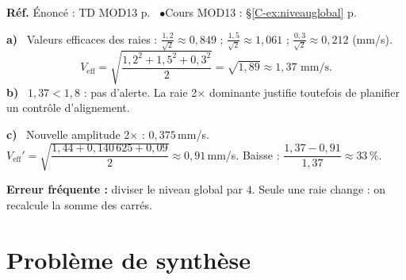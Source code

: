 \documentclass[a4paper,11pt]{article}
\newcommand{\cours}[1]{§\ref{C-#1} p.~\pageref{C-#1}}
\newcommand{\source}[2]{{\footnotesize\color{uimmgray}\textbf{Réf.} \enspace Énoncé : TD MOD13 p.~\pageref{T-#1} \enspace$\bullet$\enspace Cours MOD13 : #2}\par\smallskip}
\newcommand{\q}[1]{\textbf{\color{uimmblue}#1}\ }
\begin{document}
\begin{correction}
\source{exo:14}{\cours{ex:niveauglobal}}
\q{a)} Valeurs efficaces des raies : $\frac{1{,}2}{\sqrt2}\approx 0{,}849$ ; $\frac{1{,}5}{\sqrt2}\approx 1{,}061$ ; $\frac{0{,}3}{\sqrt2}\approx 0{,}212$ (mm/s).
\[
V_{\text{eff}} = \sqrt{\frac{1{,}2^2 + 1{,}5^2 + 0{,}3^2}{2}} = \sqrt{1{,}89}\approx 1{,}37 \text{ mm/s.}
\]
\q{b)} $1{,}37 < 1{,}8$ : pas d'alerte. La raie 2× dominante justifie toutefois de planifier un contrôle d'alignement.

\q{c)} Nouvelle amplitude 2× : $0{,}375$\,mm/s. $V_{\text{eff}}' = \sqrt{\dfrac{1{,}44 + 0{,}140\,625 + 0{,}09}{2}}\approx 0{,}91$\,mm/s. Baisse : $\dfrac{1{,}37 - 0{,}91}{1{,}37}\approx 33\,\%$.
\begin{piege}
\textbf{Erreur fréquente :} diviser le niveau global par $4$. Seule une raie change : on recalcule la somme des carrés.
\end{piege}
\end{correction}

\needspace{8cm}
\section{Problème de synthèse}
\end{document}
